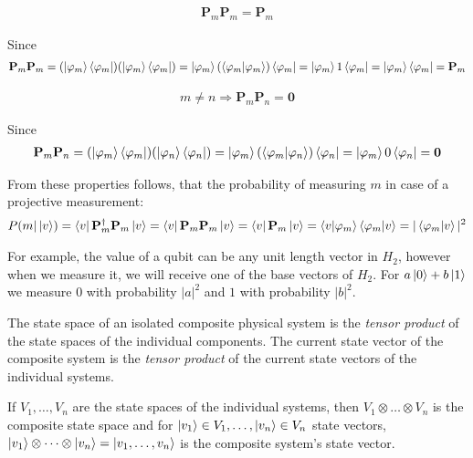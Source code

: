 \begin{property}

\begin{align*}
\mathbf{P}_m\mathbf{P}_m = \mathbf{P}_m
\end{align*}

Since
\begin{align*}
\mathbf{P}_m\mathbf{P}_m =
(\ket{\varphi_m}\bra{\varphi_m})(\ket{\varphi_m}\bra{\varphi_m}) =
\ket{\varphi_m}(\bra{\varphi_m}\ket{\varphi_m})\bra{\varphi_m} =
\ket{\varphi_m}1\bra{\varphi_m} =
\ket{\varphi_m}\bra{\varphi_m} =
\mathbf{P}_m
\end{align*}

\begin{property}

\begin{align*}
m \neq n \Rightarrow \mathbf{P}_m\mathbf{P}_n = \mathbf{0}
\end{align*}

Since
\begin{align*}
\mathbf{P}_m\mathbf{P}_n =
(\ket{\varphi_m}\bra{\varphi_m})(\ket{\varphi_n}\bra{\varphi_n}) =
\ket{\varphi_m}(\bra{\varphi_m}\ket{\varphi_n})\bra{\varphi_n} =
\ket{\varphi_m}0\bra{\varphi_n} =
\mathbf{0}
\end{align*}

From these properties follows, that the probability of measuring $m$ in case of a projective measurement:
\begin{align*}
P(m | \ket{v}) =
\bra{v}\mathbf{P}_m^{\dagger}\mathbf{P}_m \ket{v} =
\bra{v}\mathbf{P}_m\mathbf{P}_m\ket{v} = 
\bra{v}\mathbf{P}_m\ket{v} =
\bra{v}\ket{\varphi_m}\bra{\varphi_m}\ket{v} = |\bra{\varphi_m}\ket{v}|^2
\end{align*}

For example, the value of a qubit can be any unit length vector in $H_2$, however when we measure it, we will receive one
of the base vectors of $H_2$. For $a\ket{0} + b\ket{1}$ we measure $0$ with probability $|a|^2$ and $1$ with probability $|b|^2$.


The state space of an isolated composite physical system is the \textit{tensor product} of the state spaces of the individual components. The current state vector of the composite system is the \textit{tensor product} of the current state vectors of the individual systems.

If $V_1,\dots,V_n$ are the state spaces of the individual systems, then $V_1 \otimes \dots \otimes V_n$ is the composite state space and for $\ket{v_1} \in V_1, \dots, \ket{v_n} \in V_n$ state vectors, $\ket{v_1} \otimes \dots \otimes \ket{v_n} = \ket{v_1,\dots,v_n}$ is the composite system's state vector.


\end{property}
\end{property}
